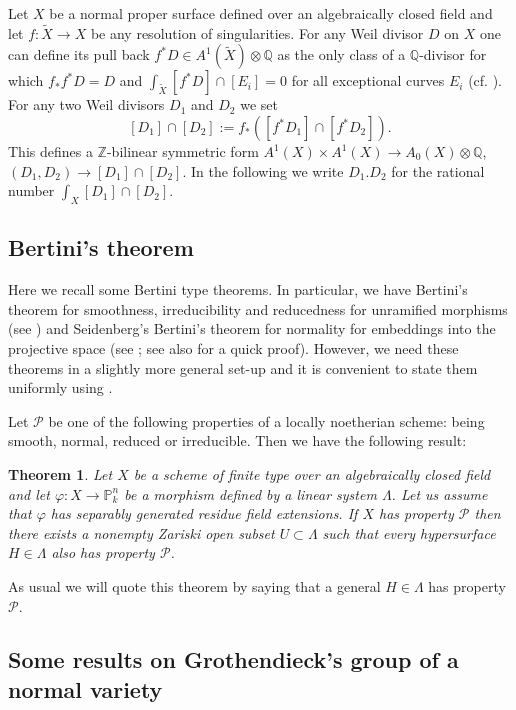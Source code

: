 \documentclass[twoside, 11pt]{article}
\theoremstyle{plain}
\newtheorem{Theorem}[Thm]{\sc Theorem}
\theoremstyle{definition}
\theoremstyle{remark}
\newcommand{\ZZ}{{\mathbb Z}}
\newcommand{\PP}{{\mathbb P}}
\newcommand{\QQ}{{\mathbb Q}}
\newcommand{\cP}{{\mathcal P}}
\begin{document}
Let $X$ be a normal proper surface defined over an algebraically closed field and let
 $f: \tilde X\to X$ be any resolution of singularities. For any Weil divisor $D$ on $X$ one can 
define its pull back $f^*D\in A^1(\tilde X)\otimes \QQ$ as  the only class of a $\QQ$-divisor 
for which $f_*f^*D=D$ and $\int_{\tilde X}[f^*D]\cap [E_i]=0$ for all exceptional curves $E_i$ (cf. \cite[Example 8.3.11]{Fu}).
For any two Weil divisors $D_1$ and $D_2$ we set 
$$[D_1]\cap [D_2]:= f_* ([f^*D_1]\cap [f^*D_2]).$$
This defines a $\ZZ$-bilinear symmetric form $A^1(X)\times A^1 (X)\to A_0(X)\otimes \QQ$, $(D_1,D_2)\to [D_1]\cap [D_2]$.
 In the following we write $D_1.D_2$ for the rational number $\int_X [D_1]\cap [D_2]$.
 
 \subsection{Bertini's theorem}
 
 Here we recall some Bertini type theorems. In particular, we have Bertini's theorem for smoothness, irreducibility and reducedness for unramified morphisms (see \cite[Theoreme 6.3 ]{Jo}) and Seidenberg's Bertini's theorem for normality for embeddings into the projective space (see \cite[Theorem 7']{Se}; see also \cite[Corollary 1.1.15]{HL} for a quick proof). However, we need these theorems in a slightly more general set-up and it is convenient to state them uniformly using \cite[Theorem 1 and Remark below Corollary 2]{CGM}. 
 
Let $\cP$ be one of the following properties of a locally noetherian scheme: being smooth, normal,  reduced or irreducible. Then we have the following result:
 
 
 \begin{Theorem}\label{Bertini}
 Let $X$ be a scheme of finite type over an algebraically closed field and let $\varphi: X\to \PP ^n_k$
be a morphism defined by a linear system $\Lambda$.
Let us assume that $\varphi$ has separably generated residue field extensions. 
If $X$ has property $\cP$ then there exists a nonempty Zariski open subset $U\subset \Lambda$ such that
every hypersurface $H\in \Lambda$ also has property $\cP$.
 \end{Theorem}
 
As usual we will quote this theorem by saying that a general $H\in \Lambda$ has property $\cP$.


 \subsection{Some results on Grothendieck's group of a normal variety}\label{Grothendieck-group}
 
\end{document}
